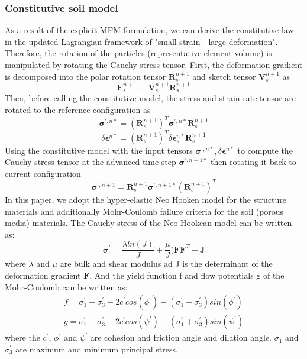 \documentclass[preprint,12pt]{elsarticle}
\begin{document}
\subsubsection{Constitutive soil model}
As a result of the explicit MPM formulation, we can derive the constitutive law in the updated Lagrangian framework of "small strain - large deformation". Therefore, the rotation of the particles (representative element volume) is manipulated by rotating the Cauchy stress tensor. First, the deformation gradient is decomposed into the polar rotation tensor $\pmb{R}_s^{n+1}$ and sketch tensor $\pmb{V}_s^{n+1}$ as
%
%
\begin{equation}
     \pmb{F}_s^{n+1} = \pmb{V}_s^{n+1} \pmb{R}_s^{n+1}
\end{equation}
%
%
Then, before calling the constitutive model, the stress and strain rate tensor are rotated to the reference configuration as
%
%
\begin{equation}
     \pmb{\sigma}^{\prime,n*} =  (\pmb{R}_s^{n+1})^T \pmb{\sigma}^{\prime,n*} \pmb{R}_s^{n+1}
\end{equation}
%
%
\begin{equation}
    \delta \pmb{\epsilon}^{n*} =  (\pmb{R}_s^{n+1})^T \delta \pmb{\epsilon}_s^{n*} \pmb{R}_s^{n+1}
\end{equation}
%
%
Using the constitutive model with the input tensors $\pmb{\sigma}^{\prime,n*}, \delta \pmb{\epsilon}^{n*}$ to compute the Cauchy stress tensor at the advanced time step $\pmb{\sigma}^{\prime,n+1*}$ then rotating it back to current configuration
%
%
\begin{equation}
    \pmb{\sigma}^{\prime,n+1} =  \pmb{R}_s^{n+1} \pmb{\sigma}^{\prime,n+1*} (\pmb{R}_s^{n+1})^T
\end{equation}
%
%
In this paper, we adopt the hyper-elastic Neo Hooken model for the structure materials and additionally Mohr-Coulomb failure criteria for the soil (porous media) materials. The Cauchy stress of the Neo Hookean model can be written as:
%
%
\begin{equation}
    \pmb{\sigma}^{\prime} =  \frac{ \lambda ln(J)}{J} + \frac{\mu}{J} (\pmb{F} \pmb{F}^T - \pmb{J}
\end{equation}
%
%
where $\lambda$ and $\mu$ are bulk and shear modulus ad J is the determinant of the deformation gradient $\pmb{F}$. And the yield function f and flow potentials g of the Mohr-Coulomb can be written as:
%
%
\begin{equation}
\begin{gathered}
   f =  \sigma_1^{\prime} -  \sigma_3^{\prime} -2c^{\prime} cos(\phi^{\prime}) - (\sigma_1^{\prime} +  \sigma_3^{\prime})sin(\phi^{\prime})\\
   g =  \sigma_1^{\prime} -  \sigma_3^{\prime} -2c^{\prime} cos(\psi^{\prime}) - (\sigma_1^{\prime} +  \sigma_3^{\prime})sin(\psi^{\prime})
\end{gathered}
\end{equation}
%
%
where the $c^{\prime}$, $\phi^{\prime}$ and $\psi^{\prime}$ are cohesion and friction angle and dilation angle. $\sigma_1^{\prime}$ and $\sigma_3^{\prime}$ are maximum and minimum principal stress.
\end{document}
